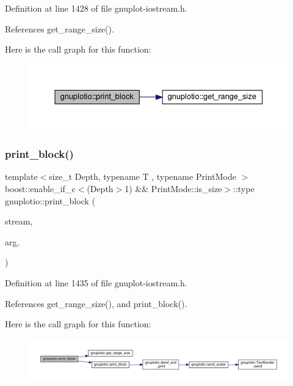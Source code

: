 Definition at line 1428 of file gnuplot-\/iostream.\+h.



References get\+\_\+range\+\_\+size().

Here is the call graph for this function\+:\nopagebreak
\begin{figure}[H]
\begin{center}
\leavevmode
\includegraphics[width=350pt]{namespacegnuplotio_ae470a0908ac5f51527ff76ecbc1616d1_cgraph}
\end{center}
\end{figure}
\mbox{\label{namespacegnuplotio_a94e97ca55dc1e5142dcc4457a5e1dd2d}} 
\subsubsection{\texorpdfstring{print\+\_\+block()}{print\_block()}\hspace{0.1cm}{\footnotesize\ttfamily [4/4]}}
{\footnotesize\ttfamily template$<$size\+\_\+t Depth, typename T , typename Print\+Mode $>$ \\
boost\+::enable\+\_\+if\+\_\+c$<$(Depth$>$1) \&\& Print\+Mode\+::is\+\_\+size$>$\+::type gnuplotio\+::print\+\_\+block (\begin{DoxyParamCaption}\item[{std\+::ostream \&}]{stream,  }\item[{T \&}]{arg,  }\item[{Print\+Mode}]{ }\end{DoxyParamCaption})}



Definition at line 1435 of file gnuplot-\/iostream.\+h.



References get\+\_\+range\+\_\+size(), and print\+\_\+block().

Here is the call graph for this function\+:\nopagebreak
\begin{figure}[H]
\begin{center}
\leavevmode
\includegraphics[width=350pt]{namespacegnuplotio_a94e97ca55dc1e5142dcc4457a5e1dd2d_cgraph}
\end{center}
\end{figure}
\mbox{\label{namespacegnuplotio_a55ff2f9abaa4b3e1c64a8f730f791b33}} 
